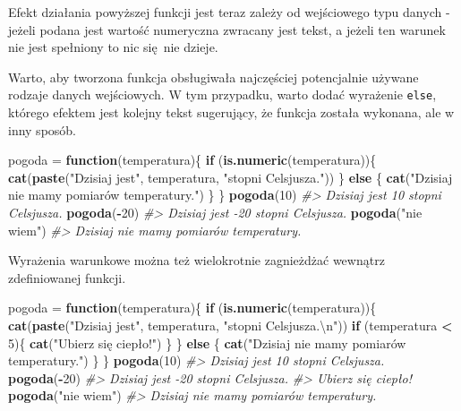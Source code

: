 \documentclass[paper=6in:9in,pagesize=pdftex,headinclude=on,footinclude=on,10pt]{scrbook}
\newenvironment{Shaded}{\begin{snugshade}}{\end{snugshade}}
\newcommand{\CharTok}[1]{\textcolor[rgb]{0.31,0.60,0.02}{#1}}
\newcommand{\CommentTok}[1]{\textcolor[rgb]{0.56,0.35,0.01}{\textit{#1}}}
\newcommand{\ControlFlowTok}[1]{\textcolor[rgb]{0.13,0.29,0.53}{\textbf{#1}}}
\newcommand{\DecValTok}[1]{\textcolor[rgb]{0.00,0.00,0.81}{#1}}
\newcommand{\KeywordTok}[1]{\textcolor[rgb]{0.13,0.29,0.53}{\textbf{#1}}}
\newcommand{\NormalTok}[1]{#1}
\newcommand{\OperatorTok}[1]{\textcolor[rgb]{0.81,0.36,0.00}{\textbf{#1}}}
\newcommand{\StringTok}[1]{\textcolor[rgb]{0.31,0.60,0.02}{#1}}
\begin{document}
Efekt działania powyższej funkcji jest teraz zależy od wejściowego typu danych - jeżeli podana jest wartość numeryczna zwracany jest tekst, a jeżeli ten warunek nie jest spełniony to nic się~nie dzieje.

Warto, aby tworzona funkcja obsługiwała najczęściej potencjalnie używane rodzaje danych wejściowych.
W tym przypadku, warto dodać wyrażenie \texttt{else}, którego efektem jest kolejny tekst sugerujący, że funkcja została wykonana, ale w inny sposób.

\begin{Shaded}
\begin{Highlighting}[]
\NormalTok{pogoda =}\StringTok{ }\ControlFlowTok{function}\NormalTok{(temperatura)\{}
  \ControlFlowTok{if}\NormalTok{ (}\KeywordTok{is.numeric}\NormalTok{(temperatura))\{}
    \KeywordTok{cat}\NormalTok{(}\KeywordTok{paste}\NormalTok{(}\StringTok{"Dzisiaj jest"}\NormalTok{, temperatura, }\StringTok{"stopni Celsjusza."}\NormalTok{))}
\NormalTok{  \} }\ControlFlowTok{else}\NormalTok{ \{}
    \KeywordTok{cat}\NormalTok{(}\StringTok{"Dzisiaj nie mamy pomiarów temperatury."}\NormalTok{)}
\NormalTok{  \}}
\NormalTok{\}}
\KeywordTok{pogoda}\NormalTok{(}\DecValTok{10}\NormalTok{)}
\CommentTok{#> Dzisiaj jest 10 stopni Celsjusza.}
\KeywordTok{pogoda}\NormalTok{(}\OperatorTok{-}\DecValTok{20}\NormalTok{)}
\CommentTok{#> Dzisiaj jest -20 stopni Celsjusza.}
\KeywordTok{pogoda}\NormalTok{(}\StringTok{"nie wiem"}\NormalTok{)}
\CommentTok{#> Dzisiaj nie mamy pomiarów temperatury.}
\end{Highlighting}
\end{Shaded}

Wyrażenia warunkowe można też wielokrotnie zagnieżdżać wewnątrz zdefiniowanej funkcji.

\begin{Shaded}
\begin{Highlighting}[]
\NormalTok{pogoda =}\StringTok{ }\ControlFlowTok{function}\NormalTok{(temperatura)\{}
  \ControlFlowTok{if}\NormalTok{ (}\KeywordTok{is.numeric}\NormalTok{(temperatura))\{}
    \KeywordTok{cat}\NormalTok{(}\KeywordTok{paste}\NormalTok{(}\StringTok{"Dzisiaj jest"}\NormalTok{, temperatura, }\StringTok{"stopni Celsjusza.}\CharTok{\textbackslash{}n}\StringTok{"}\NormalTok{))}
    \ControlFlowTok{if}\NormalTok{ (temperatura }\OperatorTok{<}\StringTok{ }\DecValTok{5}\NormalTok{)\{}
      \KeywordTok{cat}\NormalTok{(}\StringTok{"Ubierz się ciepło!"}\NormalTok{)}
\NormalTok{    \}}
\NormalTok{  \} }\ControlFlowTok{else}\NormalTok{ \{}
    \KeywordTok{cat}\NormalTok{(}\StringTok{"Dzisiaj nie mamy pomiarów temperatury."}\NormalTok{)}
\NormalTok{  \}}
\NormalTok{\}}
\KeywordTok{pogoda}\NormalTok{(}\DecValTok{10}\NormalTok{)}
\CommentTok{#> Dzisiaj jest 10 stopni Celsjusza.}
\KeywordTok{pogoda}\NormalTok{(}\OperatorTok{-}\DecValTok{20}\NormalTok{)}
\CommentTok{#> Dzisiaj jest -20 stopni Celsjusza.}
\CommentTok{#> Ubierz się ciepło!}
\KeywordTok{pogoda}\NormalTok{(}\StringTok{"nie wiem"}\NormalTok{)}
\CommentTok{#> Dzisiaj nie mamy pomiarów temperatury.}
\end{Highlighting}
\end{Shaded}
\end{document}
